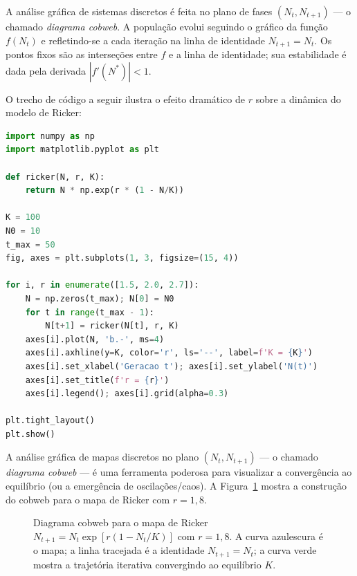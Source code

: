 A análise gráfica de sistemas discretos é feita no plano de fases
$(N_t, N_{t+1})$ --- o chamado \emph{diagrama cobweb}. A população evolui
seguindo o gráfico da função $f(N_t)$ e refletindo-se a cada iteração na
linha de identidade $N_{t+1} = N_t$. Os pontos fixos são as interseções
entre $f$ e a linha de identidade; sua estabilidade é dada pela derivada $|f'(N^*)| < 1$.

O trecho de código a seguir ilustra o efeito dramático de $r$ sobre a
dinâmica do modelo de Ricker:

\begin{lstlisting}[language=Python, caption=Dinamica de Ricker para varios r]
import numpy as np
import matplotlib.pyplot as plt

def ricker(N, r, K):
    return N * np.exp(r * (1 - N/K))

K = 100
N0 = 10
t_max = 50
fig, axes = plt.subplots(1, 3, figsize=(15, 4))

for i, r in enumerate([1.5, 2.0, 2.7]):
    N = np.zeros(t_max); N[0] = N0
    for t in range(t_max - 1):
        N[t+1] = ricker(N[t], r, K)
    axes[i].plot(N, 'b.-', ms=4)
    axes[i].axhline(y=K, color='r', ls='--', label=f'K = {K}')
    axes[i].set_xlabel('Geracao t'); axes[i].set_ylabel('N(t)')
    axes[i].set_title(f'r = {r}')
    axes[i].legend(); axes[i].grid(alpha=0.3)

plt.tight_layout()
plt.show()
\end{lstlisting}

A análise gráfica de mapas discretos no plano $(N_t, N_{t+1})$ --- o chamado
\emph{diagrama cobweb} --- é uma ferramenta poderosa para visualizar a
convergência ao equilíbrio (ou a emergência de oscilações/caos). A
Figura~\ref{fig:10-ricker-cobweb} mostra a construção do cobweb para o mapa
de Ricker com $r=1{,}8$.

\begin{figure}[htbp]
\centering
{}
\caption{Diagrama cobweb para o mapa de Ricker $N_{t+1} = N_t \exp\!\left[r(1-N_t/K)\right]$ com $r=1{,}8$. A curva azulescura é o mapa; a linha tracejada é a identidade $N_{t+1}=N_t$; a curva verde mostra a trajetória iterativa convergindo ao equilíbrio $K$.}
\label{fig:10-ricker-cobweb}
\end{figure}

